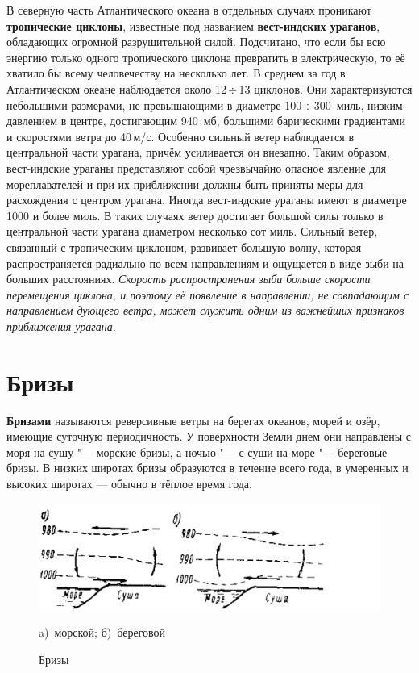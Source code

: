 \documentclass[a4paper, 12pt, twoside, draft, book, russian, fittopage, cyremdash, openright]{ncc}
\newcommand{\mps}{\,м/с\xspace}
\newcommand{\otdo}{\,\ensuremath{\div}\,}
\begin{document}
В северную часть Атлантического океана в отдельных случаях проникают
\textbf{тропические циклоны}, известные под
названием \textbf{вест-индских ураганов},
обладающих огромной разрушительной силой. Подсчитано, что если бы всю
энергию только одного тропического циклона превратить в электрическую,
то её хватило бы всему человечеству на несколько лет. В среднем за год
в Атлантическом океане наблюдается около 12\otdo13 циклонов. Они
характеризуются небольшими размерами, не превышающими в диаметре
100\otdo300~миль, низким давлением в центре, достигающим 940~мб,
большими барическими градиентами и скоростями ветра до
40\mps. Особенно сильный ветер наблюдается в центральной части
урагана, причём усиливается он внезапно. Таким образом, вест-индские
ураганы представляют собой чрезвычайно опасное явление для
мореплавателей и при их приближении должны быть приняты меры для
расхождения с центром урагана.  Иногда вест-индские ураганы имеют в
диаметре 1000 и более миль. В таких случаях ветер достигает большой
силы только в центральной части урагана диаметром несколько сот
миль. Сильный ветер, связанный с тропическим циклоном, развивает
большую волну, которая распространяется радиально по всем направлениям
и ощущается в виде зыби на больших расстояниях. \textit{Скорость
  распространения зыби больше скорости перемещения циклона, и поэтому
  её появление в направлении, не совпадающим с направлением дующего
  ветра, может служить одним из важнейших признаков приближения
  урагана}.

\section{Бризы}
\label{sec:breeze}

\textbf{Бризами} называются реверсивные ветры на берегах
океанов, морей и озёр, имеющие суточную периодичность. У поверхности
Земли днем они направлены с моря на сушу "--- морские бризы, а ночью
"--- с суши на море "--- береговые бризы. В низких широтах бризы
образуются в течение всего года, в умеренных и высоких широтах —
обычно в тёплое время года.

\begin{figure}[htb]
   \centering
   \includegraphics[scale=0.2]{01_breeze.png}
   \caption{Бризы}
   \label{fig:01_breeze}
   \centering{}
   \small
   a)~морской; б)~береговой
\end{figure}
\end{document}
